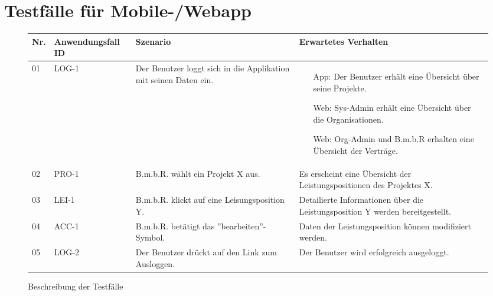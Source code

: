 
\section{Testfälle für Mobile-/Webapp}
\begin{figure}[!h]
	\begin{center}
		\begin{tabularx}{\textwidth}{ p{} | p{} | p{} | X }
			\textbf{Nr.} & \textbf{Anwendungsfall ID} & \textbf{Szenario} & \textbf{Erwartetes Verhalten} \\ \hline
			01 & LOG-1 & Der Benutzer loggt sich in die Applikation mit seinen Daten ein. &
			\begin{itemize}
				\item[App:] Der Benutzer erhält eine Übersicht über seine Projekte.
				\item[Web:] Sys-Admin erhält eine Übersicht über die Organisationen.
				\item[Web:] Org-Admin und B.m.b.R erhalten eine Übersicht der Verträge.
			\end{itemize} \\ \hline
			02 & PRO-1 & B.m.b.R. wählt ein Projekt X aus. & Es erscheint eine Übersicht der Leistungspositionen des Projektes X. \\ \hline
			03 & LEI-1 & B.m.b.R. klickt auf eine Leisungsposition Y. & Detailierte Informationen über die Leistungsposition Y werden bereitgestellt. \\ \hline
			04 & ACC-1 & B.m.b.R. betätigt das ''bearbeiten''-Symbol. & Daten der Leistungsposition können modifiziert werden. \\ \hline
			05 & LOG-2 & Der Benutzer drückt auf den Link zum Ausloggen. & Der Benutzer wird erfolgreich ausgeloggt. \\ \hline
		\end{tabularx}	
	\end{center}
	\caption{Beschreibung der Testfälle}
	\label{fig:testfaelle-beide-anwendungen-tabelle}
\end{figure}

\newpage
